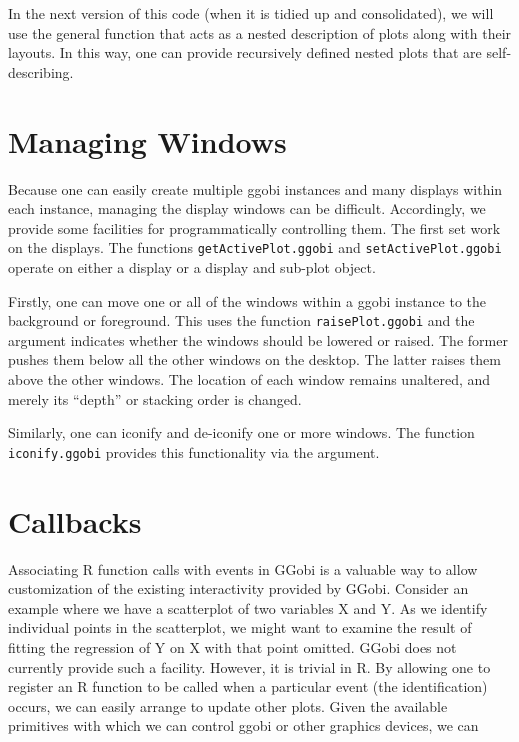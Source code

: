 \documentclass{article}
\def\SFunction#1{{\texttt{\red #1}}}
\begin{document}
In the next version of this code (when it is tidied up and
consolidated), we will use the general  function
that acts as a nested description of plots along with their layouts.
In this way, one can provide recursively defined nested plots that are
self-describing.





\section{Managing Windows}
Because one can easily create multiple ggobi instances and many
displays within each instance, managing the display windows can be
difficult. Accordingly, we provide some facilities for
programmatically controlling them.  The first set work on the
displays.  The functions \SFunction{getActivePlot.ggobi} and
\SFunction{setActivePlot.ggobi} operate on either a display or a
display and sub-plot object.

Firstly, one can move one or all of the windows within a ggobi
instance to the background or foreground.  This uses the function
\SFunction{raisePlot.ggobi} and the argument  indicates
whether the windows should be lowered or raised.  The former pushes
them below all the other windows on the desktop.  The latter raises
them above the other windows. The location of each window remains
unaltered, and merely its ``depth'' or stacking order is changed.

Similarly, one can iconify and de-iconify one or more windows.  The
function \SFunction{iconify.ggobi} provides this functionality via the
 argument.




\section{Callbacks}

Associating R function calls with events in GGobi
is a valuable way to allow customization of the existing interactivity
provided by GGobi.  Consider an example where we have a scatterplot of
two variables X and Y.  As we identify individual points in the
scatterplot, we might want to examine the result of fitting the
regression of Y on X with that point omitted.  GGobi does not
currently provide such a facility.  However, it is trivial in R.  By
allowing one to register an R function to be called when a particular
event (the identification) occurs, we can easily arrange to update
other plots.  Given the available primitives with which we can control
ggobi or other graphics devices, we can
\end{document}
